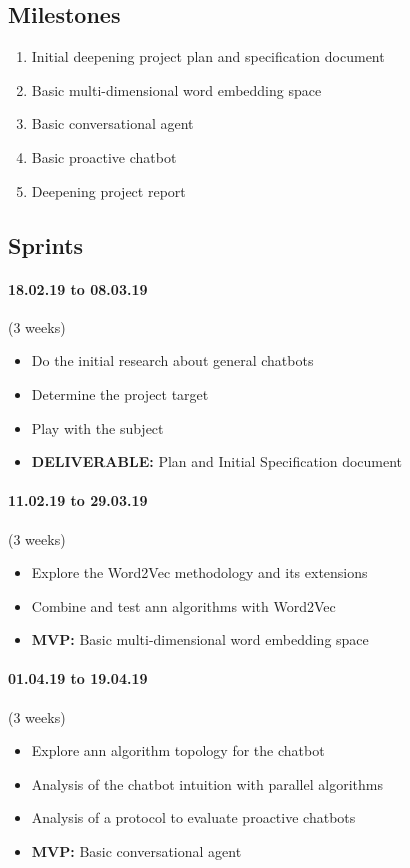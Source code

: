 \subsection{Milestones}
\begin{enumerate}
    \setlength\itemsep{0em}
    \item Initial deepening project plan and specification document
    \item Basic multi-dimensional word embedding space
    \item Basic conversational agent
    \item Basic proactive chatbot
    \item Deepening project report
\end{enumerate}

\subsection{Sprints}

\paragraph{18.02.19 to 08.03.19} (3 weeks) 
\begin{itemize}
    \setlength\itemsep{0em}
    \item Do the initial research about general chatbots
    \item Determine the project target
    \item Play with the subject
    \item \textbf{DELIVERABLE:} Plan and Initial Specification document
\end{itemize}

\paragraph{11.02.19 to 29.03.19} (3 weeks)
\begin{itemize}
    \setlength\itemsep{0em}
    \item Explore the Word2Vec methodology and its extensions
    \item Combine and test \acrshort{ann} algorithms with Word2Vec
    \item \textbf{MVP:} Basic multi-dimensional word embedding space
\end{itemize}

\paragraph{01.04.19 to 19.04.19} (3 weeks)
\begin{itemize}
    \setlength\itemsep{0em}
    \item Explore \acrshort{ann} algorithm topology for the chatbot
    \item Analysis of the chatbot intuition with parallel algorithms
    \item Analysis of a protocol to evaluate proactive chatbots
    \item \textbf{MVP:} Basic conversational agent
\end{itemize}

